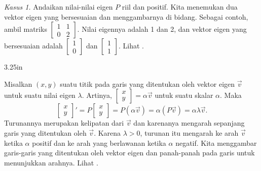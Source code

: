 \emph{Kasus 1.}  Andaikan nilai-nilai eigen $P$ riil dan positif.
Kita menemukan dua vektor eigen yang bersesuaian dan menggambarnya di bidang.  Sebagai
contoh, ambil
matriks $\left[ \begin{smallmatrix} 1 & 1 \\ 0 & 2 \end{smallmatrix}
\right]$.
Nilai eigennya adalah 1 dan 2, dan vektor eigen yang bersesuaian adalah
$\left[ \begin{smallmatrix} 1 \\ 0 \end{smallmatrix} \right]$ dan
$\left[ \begin{smallmatrix} 1 \\ 1 \end{smallmatrix} \right]$.  Lihat
.

\begin{mywrapfig}[14]{3.25in}
\capstart
{}
\caption{Vektor eigen dari $P$.\label{pln:source-eigfig}}
\end{mywrapfig}

Misalkan $(x,y)$ suatu titik pada garis yang ditentukan oleh vektor eigen
$\vec{v}$ untuk suatu nilai eigen $\lambda$.
Artinya,
$\left[ \begin{smallmatrix} x \\ y \end{smallmatrix} \right] = \alpha \vec{v}$
untuk suatu skalar $\alpha$.
Maka 
\begin{equation*}
\begin{bmatrix} x \\ y \end{bmatrix} '
=
P \begin{bmatrix} x \\ y \end{bmatrix}
=
P ( \alpha \vec{v} ) =  \alpha ( P \vec{v} )
= \alpha \lambda \vec{v} .
\end{equation*}
Turunannya merupakan kelipatan dari $\vec{v}$ dan karenanya mengarah sepanjang
garis yang ditentukan oleh $\vec{v}$.  Karena $\lambda > 0$, turunan itu mengarah ke
arah $\vec{v}$ ketika $\alpha$ positif dan ke arah yang berlawanan
ketika $\alpha$ negatif.  Kita menggambar garis-garis yang ditentukan oleh
vektor eigen dan
panah-panah pada garis untuk menunjukkan arahnya.
Lihat .

